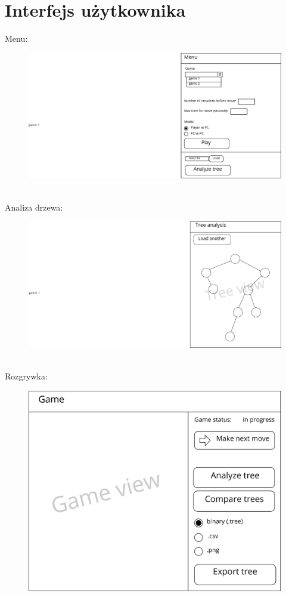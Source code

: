 \documentclass{article}
\let\oldsection\section
\renewcommand\section{\clearpage\oldsection}
\begin{document}
	\section{Interfejs użytkownika}
	Menu:
	\begin{figure}[h!]
		\centering
		\includegraphics[scale=0.8, trim={18.8cm 0 0 0},clip]{menu-eps}
	\end{figure}\\
	Analiza drzewa:
	\begin{figure}[h!]
		\centering
		\includegraphics[scale=0.8, trim={18cm 0 0 0},clip]{analyze-eps}
	\end{figure}
	\pagebreak\\
	Rozgrywka:
	\begin{figure}[h!]
		\centering
		\includegraphics[scale=0.8]{game-eps}
	\end{figure}
	
\end{document}
